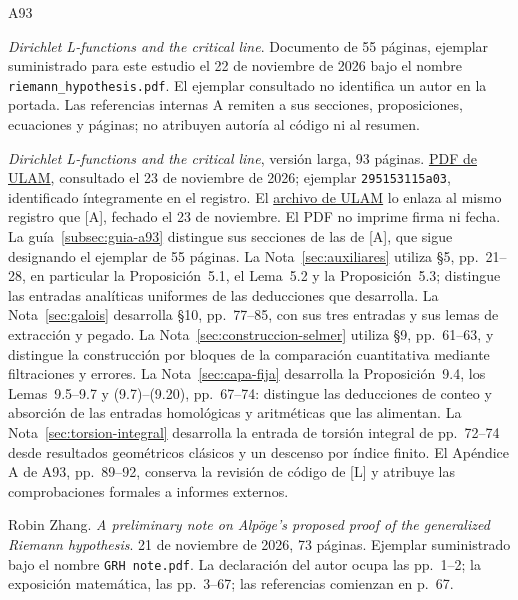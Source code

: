 {}
\renewcommand{\refname}{Fuentes de esta entrega}
\begin{thebibliography}{A93}

\emph{Dirichlet L-functions and the critical line}.
Documento de 55 páginas, ejemplar suministrado para este estudio el
22 de noviembre de 2026 bajo el nombre
\texttt{riemann\_hypothesis.pdf}.
El ejemplar consultado no identifica un autor en la portada.
Las referencias internas A remiten a sus secciones, proposiciones,
ecuaciones y páginas; no atribuyen autoría al código ni al resumen.

\emph{Dirichlet L-functions and the critical line}, versión larga,
93 páginas. \href{https://www.ulam.ai/research/rh-long.pdf}{PDF de ULAM},
consultado el 23 de noviembre de 2026; ejemplar
\texttt{295153115a03}, identificado íntegramente en el registro.
El \href{https://www.ulam.ai/archive}{archivo de ULAM} lo enlaza al mismo
registro que [A], fechado el 23 de noviembre. El PDF no imprime firma
ni fecha. La guía~\ref{subsec:guia-a93} distingue sus secciones de las
de [A], que sigue designando el ejemplar de 55 páginas.
La Nota~\ref{sec:auxiliares} utiliza §5, pp.~21--28, en particular
la Proposición~5.1, el Lema~5.2 y la Proposición~5.3; distingue
las entradas analíticas uniformes de las deducciones que desarrolla.
La Nota~\ref{sec:galois} desarrolla §10, pp.~77--85,
con sus tres entradas y sus lemas de extracción y pegado.
La Nota~\ref{sec:construccion-selmer} utiliza §9, pp.~61--63,
y distingue la construcción por bloques de la comparación
cuantitativa mediante filtraciones y errores.
La Nota~\ref{sec:capa-fija} desarrolla la Proposición~9.4,
los Lemas~9.5--9.7 y (9.7)--(9.20), pp.~67--74:
distingue las deducciones de conteo y absorción de las
entradas homológicas y aritméticas que las alimentan.
La Nota~\ref{sec:torsion-integral} desarrolla la entrada
de torsión integral de pp.~72--74 desde resultados geométricos
clásicos y un descenso por índice finito.
El Apéndice A de A93, pp.~89--92, conserva la revisión de código de [L]
y atribuye las comprobaciones formales a informes externos.

Robin Zhang.
\emph{A preliminary note on Alpöge's proposed proof of the generalized
Riemann hypothesis}.
21 de noviembre de 2026, 73 páginas.
Ejemplar suministrado bajo el nombre \texttt{GRH note.pdf}.
La declaración del autor ocupa las pp.~1--2; la exposición matemática,
las pp.~3--67; las referencias comienzan en p.~67.


\end{thebibliography}
